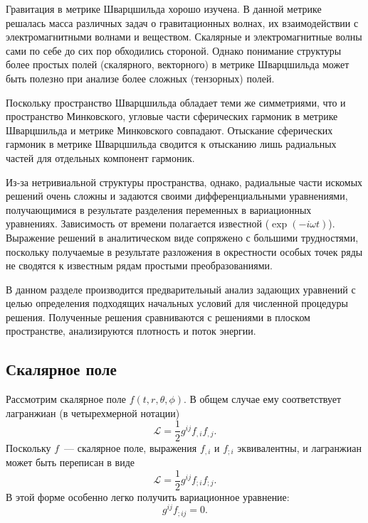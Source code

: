 \documentclass[\docroot/reports/draft/report.tex]{subfiles}
\begin{document}
\onlyinsubfile{\tableofcontents}

Гравитация в метрике Шварцшильда хорошо изучена. В данной метрике решалась масса различных задач о гравитационных волнах, их взаимодействии с электромагнитными волнами и веществом. Скалярные и электромагнитные волны сами по себе до сих пор обходились стороной. Однако понимание структуры более простых полей (скалярного, векторного) в метрике Шварцшильда может быть полезно при анализе более сложных (тензорных) полей.

Поскольку пространство Шварцшильда обладает теми же симметриями, что и пространство Минковского, угловые части сферических гармоник в метрике Шварцшильда и метрике Минковского совпадают. Отыскание сферических гармоник в метрике Шварцшильда сводится к отысканию лишь радиальных частей для отдельных компонент гармоник.

Из-за нетривиальной структуры пространства, однако, радиальные части искомых решений очень сложны и задаются своими дифференциальными уравнениями, получающимися в результате разделения переменных в вариационных уравнениях. Зависимость от времени полагается известной ($\exp(- i \omega t)$). Выражение решений в аналитическом виде сопряжено с большими трудностями, поскольку получаемые в результате разложения в окрестности особых точек ряды не сводятся к известным рядам простыми преобразованиями.

В данном разделе производится предварительный анализ задающих уравнений с целью определения подходящих начальных условий для численной процедуры решения. Полученные решения сравниваются с решениями в плоском пространстве, анализируются плотность и поток энергии.

\subsection{Скалярное поле}\label{sec:scal}

    Рассмотрим скалярное поле $f(t,r,\theta,\phi)$. В общем случае ему соответствует лагранжиан (в четырехмерной нотации)
    \begin{equation}
        \mathcal{L} = \frac{1}{2} g^{ij} f_{,i} f_{,j}.
    \end{equation}
    Поскольку $f$~--- скалярное поле, выражения $f_{,i}$ и $f_{;i}$ эквивалентны, и лагранжиан может быть переписан в виде
    \begin{equation}
        \mathcal{L} = \frac{1}{2} g^{ij} f_{;i} f_{;j}.
    \end{equation}
    В этой форме особенно легко получить вариационное уравнение:
    \begin{equation}
        g^{ij} f_{;ij} = 0.
    \end{equation}
\end{document}
